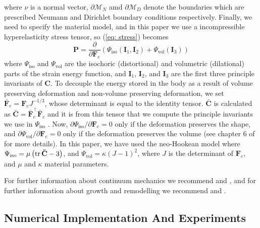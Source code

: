 where $\nu$ is a normal vector, $\partial\mathcal{M}_N$ amd $\partial\mathcal{M}_D$ denote the boundaries which are prescribed Neumann and Dirichlet boundary conditions respectively. Finally, we need to specify the material model, and in this paper we use a  incompressible hyperelasticity stress tensor, so (\ref{eq: stress}) becomes
\begin{equation*}
    \mathbf{P} = \frac{\partial }{\partial \mathbf{F}_e}(\Psi_\text{iso}(\mathbf{I}_1, \mathbf{I}_2) + \Psi_\text{vol}(\mathbf{I}_3))
\end{equation*}
where $\Psi_\text{iso}$ and $\Psi_\text{vol}$ are the isochoric (distortional) and volumetric (dilational) parts of the strain energy function, and $\mathbf{I}_1$, $\mathbf{I}_2$, and $\mathbf{I}_3$ are the first three principle invariants of $\mathbf{C}$. To decouple the energy stored in the body as a result of volume preserving deformation and non-volume preserving deformation, we set $\mathbf{\bar{F}}_e = \mathbf{F}_eJ^{-1/3}$, whose determinant is equal to the identity tensor. $\mathbf{\bar{C}}$ is calculated as $\mathbf{\bar{C}} = \mathbf{\bar{F}}_e^\top \mathbf{\bar{F}}_e$ and it is from this tensor that we compute the principle invariants we use in $\Psi_\text{iso}$ . Now, $\partial\Psi_\text{iso}/\partial \mathbf{F}_e = 0$ only if the deformation preserves the shape, and $\partial\Psi_\text{vol}/\partial \mathbf{F}_e = 0$ only if the deformation preserves the volume (see chapter 6 of \citep{Holzapfel2002} for more details). In this paper, we have used the neo-Hookean model where $\Psi_\text{iso} = \mu\left(\tr\mathbf{\bar{C}} - 3\right)$, and $\Psi_\text{vol} = \kappa(J-1)^2$, where $J$ is the determinant of $\mathbf{F}_e$, and $\mu$ and $\kappa$ material parameters. \par 
For further information about continuum mechanics we recommend \citep{Marsden1983} and \citep{Holzapfel2002}, and for further information about growth and remodelling we recommend \citep{Goriely2017} and \citep{Yavari2010}.

\subsection{Numerical Implementation And Experiments}
 
